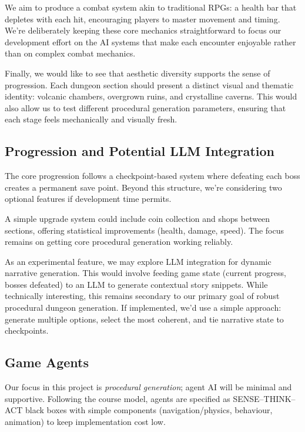 \documentclass[11pt]{article}
\begin{document}
We aim to produce a combat system akin to traditional RPGs: a health bar that depletes with each hit, encouraging players to master movement and timing. 
We're deliberately keeping these core mechanics straightforward to focus our development effort on the AI systems that make each encounter enjoyable rather than on complex combat mechanics.

Finally, we would like to see that aesthetic diversity supports the sense of progression. 
Each dungeon section should present a distinct visual and thematic identity: volcanic chambers, overgrown ruins, and crystalline caverns. 
This would also allow us to test different procedural generation parameters, ensuring that each stage feels mechanically and visually fresh.

\subsection{Progression and Potential LLM Integration}

The core progression follows a checkpoint-based system where defeating each boss creates a permanent save point. 
Beyond this structure, we're considering two optional features if development time permits.

A simple upgrade system could include coin collection and shops between sections, offering statistical improvements (health, damage, speed). 
The focus remains on getting core procedural generation working reliably.

As an experimental feature, we may explore LLM integration for dynamic narrative generation. 
This would involve feeding game state (current progress, bosses defeated) to an LLM to generate contextual story snippets.
While technically interesting, this remains secondary to our primary goal of robust procedural dungeon generation. 
If implemented, we'd use a simple approach: generate multiple options, select the most coherent, and tie narrative state to checkpoints.

\subsection{Game Agents}
\label{sec:game_agents}

Our focus in this project is \emph{procedural generation}; agent AI will be minimal and supportive. Following the course model, agents are specified as SENSE–THINK–ACT black boxes with simple components (navigation/physics, behaviour, animation) to keep implementation cost low.
\end{document}
